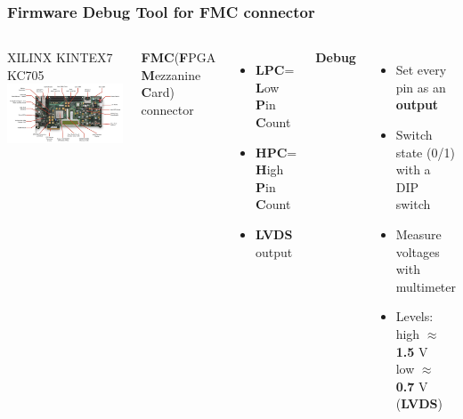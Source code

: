 \documentclass[aspectratio=169]{beamer}
\begin{document}
	\begin{frame}
		\frametitle{Firmware Debug Tool for FMC connector}
		\begin{columns}
			\begin{center}
				{\color{blue} XILINX KINTEX7 KC705}
				\includegraphics[width=1.0 \textwidth]{IMG/KC705.PNG}
			\end{center}
			\textbf{FMC}{\tiny (\textbf{F}PGA \textbf{M}ezzanine \textbf{C}ard)} connector
			\begin{itemize}
				\item \textbf{LPC}= \textbf{L}ow \textbf{P}in \textbf{C}ount
				\item \textbf{HPC}= \textbf{H}igh \textbf{P}in \textbf{C}ount
				\item \textbf{LVDS} output 
			\end{itemize}
			\textbf{Debug}
			\begin{itemize}
				\item Set every pin as an \textbf{output}
				\item Switch state (0/1) with a DIP switch
				\item Measure voltages with multimeter
				\item Levels: high $\approx$ \textbf{1.5} V \\ low $\approx$ \textbf{0.7} V (\textbf{LVDS})
			\end{itemize}
		\end{columns}
	\end{frame}
\end{document}
